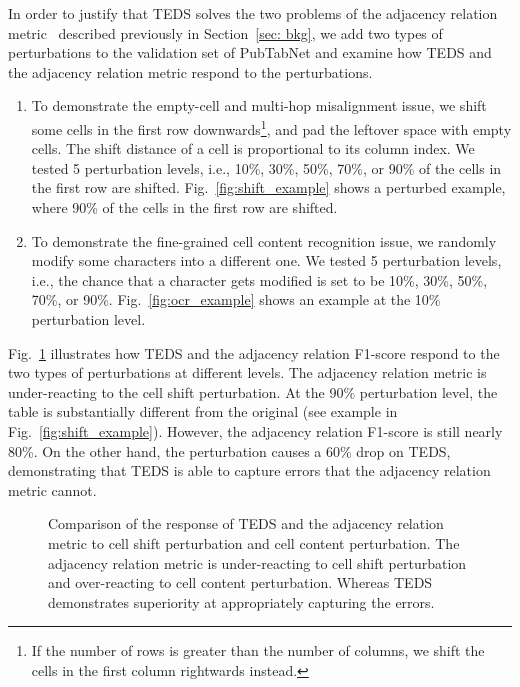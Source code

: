 \documentclass[conference]{IEEEtran}
\begin{document}
In order to justify that TEDS solves the two problems of the adjacency relation
metric~\cite{hurst2003constraint} described previously in Section~\ref{sec:
bkg}, we add two types of perturbations to the validation set of PubTabNet and
examine how TEDS and the adjacency relation metric respond to the perturbations.

\begin{enumerate}[noitemsep,leftmargin=*]
  \item To demonstrate the empty-cell and multi-hop misalignment issue, we shift
  some cells in the first row downwards\footnote{If the number of rows is
  greater than the number of columns, we shift the cells in the first column
  rightwards instead.}, and pad the leftover space with empty cells. The shift
  distance of a cell is proportional to its column index. We tested 5
  perturbation levels, i.e., 10\%, 30\%, 50\%, 70\%, or 90\% of the cells in the
  first row are shifted. Fig.~\ref{fig:shift_example} shows a perturbed
  example, where 90\% of the cells in the first row are shifted.
  \item To demonstrate the fine-grained cell content recognition issue, we
  randomly modify some characters into a different one. We tested 5 perturbation
  levels, i.e., the chance that a character gets modified is set to be 10\%,
  30\%, 50\%, 70\%, or 90\%. Fig.~\ref{fig:ocr_example} shows an
  example at the 10\% perturbation level.
\end{enumerate}


Fig.~\ref{fig:metric_analysis} illustrates how TEDS and the adjacency relation
F1-score respond to the two types of perturbations at different levels. The
adjacency relation metric is under-reacting to the cell shift perturbation. At
the 90\% perturbation level, the table is substantially different from the
original (see example in Fig.~\ref{fig:shift_example}).
However, the adjacency relation F1-score is still nearly 80\%. On the other
hand, the perturbation causes a 60\% drop on TEDS, demonstrating that TEDS is
able to capture errors that the adjacency relation metric cannot.

\begin{figure}[!ht]
  \centering
  \begin{minipage}[b]{.5\linewidth}\end{minipage}\begin{minipage}[b]{.5\linewidth}\end{minipage}\caption{Comparison of the response of TEDS and the adjacency relation metric to cell shift perturbation and cell content perturbation. The adjacency relation metric is under-reacting to cell shift perturbation and over-reacting to cell content perturbation. Whereas TEDS demonstrates superiority at appropriately capturing the errors.}
  \label{fig:metric_analysis}
\end{figure}
\end{document}
